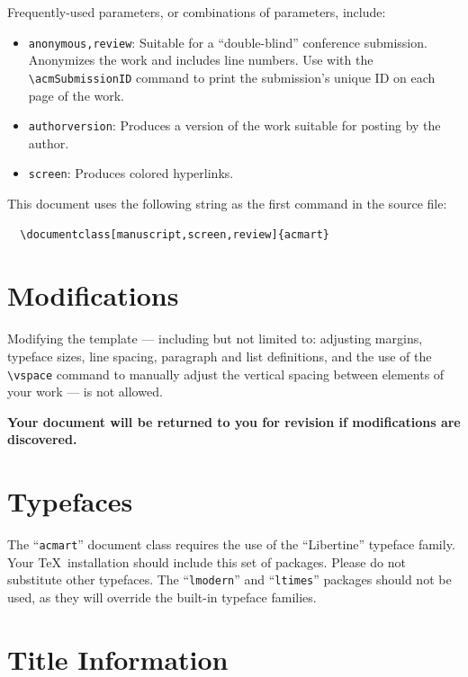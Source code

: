 \documentclass[
  letterpaper,
  DIV=11,
  numbers=noendperiod]{scrartcl}
\providecommand{\tightlist}{%
  \setlength{\itemsep}{0pt}\setlength{\parskip}{0pt}}\usepackage{longtable,booktabs,array}
\begin{document}
Frequently-used parameters, or combinations of parameters, include:

\begin{itemize}
\tightlist
\item
  \texttt{anonymous,review}: Suitable for a ``double-blind'' conference
  submission. Anonymizes the work and includes line numbers. Use with
  the \texttt{\textbackslash{}acmSubmissionID} command to print the
  submission's unique ID on each page of the work.
\item
  \texttt{authorversion}: Produces a version of the work suitable for
  posting by the author.
\item
  \texttt{screen}: Produces colored hyperlinks.
\end{itemize}

This document uses the following string as the first command in the
source file:

\begin{verbatim}
  \documentclass[manuscript,screen,review]{acmart}
\end{verbatim}

\hypertarget{modifications}{%
\section{Modifications}\label{modifications}}

Modifying the template --- including but not limited to: adjusting
margins, typeface sizes, line spacing, paragraph and list definitions,
and the use of the \texttt{\textbackslash{}vspace} command to manually
adjust the vertical spacing between elements of your work --- is not
allowed.

\textbf{Your document will be returned to you for revision if
modifications are discovered.}

\hypertarget{typefaces}{%
\section{Typefaces}\label{typefaces}}

The ``\texttt{acmart}'' document class requires the use of the
``Libertine'' typeface family. Your \TeX~installation should include
this set of packages. Please do not substitute other typefaces. The
``\texttt{lmodern}'' and ``\texttt{ltimes}'' packages should not be
used, as they will override the built-in typeface families.

\hypertarget{title-information}{%
\section{Title Information}\label{title-information}}
\end{document}
